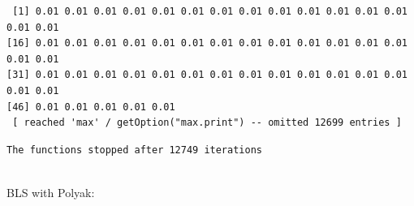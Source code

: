\documentclass[
  letterpaper,
  DIV=11,
  numbers=noendperiod]{scrartcl}
\newenvironment{Shaded}{\begin{snugshade}}{\end{snugshade}}
\newcommand{\FunctionTok}[1]{\textcolor[rgb]{0.28,0.35,0.67}{#1}}
\newcommand{\NormalTok}[1]{\textcolor[rgb]{0.00,0.23,0.31}{#1}}
\newcommand{\SpecialCharTok}[1]{\textcolor[rgb]{0.37,0.37,0.37}{#1}}
\newcommand{\StringTok}[1]{\textcolor[rgb]{0.13,0.47,0.30}{#1}}
\begin{document}
\begin{Shaded}
\end{Shaded}

\begin{verbatim}
 [1] 0.01 0.01 0.01 0.01 0.01 0.01 0.01 0.01 0.01 0.01 0.01 0.01 0.01 0.01 0.01
[16] 0.01 0.01 0.01 0.01 0.01 0.01 0.01 0.01 0.01 0.01 0.01 0.01 0.01 0.01 0.01
[31] 0.01 0.01 0.01 0.01 0.01 0.01 0.01 0.01 0.01 0.01 0.01 0.01 0.01 0.01 0.01
[46] 0.01 0.01 0.01 0.01 0.01
 [ reached 'max' / getOption("max.print") -- omitted 12699 entries ]
\end{verbatim}

\begin{Shaded}
\end{Shaded}

\begin{verbatim}
The functions stopped after 12749 iterations 
 
\end{verbatim}

BLS with Polyak:
\end{document}
